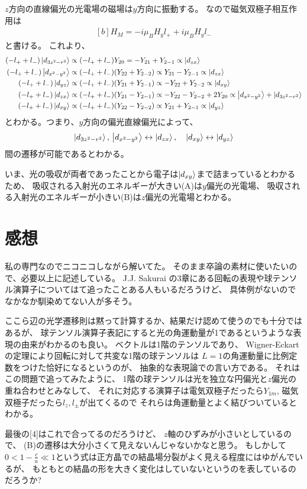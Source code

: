 \documentclass[../ap_2011.tex]{subfiles}
\begin{document}
\(z\)方向の直線偏光の光電場の磁場は\(y\)方向に振動する。
なので磁気双極子相互作用は
\begin{equation}\begin{aligned}[b]
    H_M = -i\mu_BH_yl_+ + i\mu_BH_yl_-
\end{aligned}\end{equation}
と書ける。
これより、
\begin{equation}\begin{aligned}[b]
    (-l_+ +l_-)\ket{d_{3z^2-r^2}} &\propto (-l_+ +l_-) Y_{20} = -Y_{21}+Y_{2-1} \propto \ket{d_{zx}}\\
    (-l_+ +l_-)\ket{d_{x^2-y^2}} &\propto (-l_+ +l_-) (Y_{22}+Y_{2-2}) \propto Y_{21}-Y_{2-1} \propto \ket{d_{zx}}\\
    (-l_+ +l_-)\ket{d_{yz}} &\propto (-l_+ +l_-) (Y_{21}+Y_{2-1}) \propto -Y_{22}+Y_{2-2} \propto \ket{d_{xy}}\\
    (-l_+ +l_-)\ket{d_{zx}} &\propto (-l_+ +l_-) (Y_{21}-Y_{2-1}) \propto -Y_{22}-Y_{2-2}+2Y_{20} \propto \ket{d_{x^2-y^2}}+\ket{d_{3z^2-r^2}}\\
    (-l_+ +l_-)\ket{d_{xy}} &\propto (-l_+ +l_-) (Y_{22}-Y_{2-2}) \propto Y_{21}+Y_{2-1} \propto \ket{d_{yz}}
\end{aligned}\end{equation}
とわかる。つまり、\(y\)方向の偏光直線偏光によって、
\begin{equation}\begin{aligned}[b]
    \ket{d_{3z^2-r^2}},\,\ket{d_{x^2-y^2}}\leftrightarrow \ket{d_{zx}},\quad \ket{d_{xy}}\leftrightarrow\ket{d_{yz}}
\end{aligned}\end{equation}
間の遷移が可能であるとわかる。

いま、光の吸収が両者であったことから電子は\(\ket{d_{xy}}\)まで詰まっているとわかるため、
吸収される入射光のエネルギーが大きい(A)は\(y\)偏光の光電場、
吸収される入射光のエネルギーが小きい(B)は\(z\)偏光の光電場とわかる。

\section*{感想}
私の専門なのでニコニコしながら解いてた。
そのまま卒論の素材に使いたいので、必要以上に記述している。
J.J. Sakurai の3章にある回転の表現や球テンソル演算子についてはて追ったことある人もいるだろうけど、
具体例がないのでなかなか馴染めてない人が多そう。

ここら辺の光学遷移則は黙って計算するか、結果だけ認めて使うのでも十分ではあるが、
球テンソル演算子表記にすると光の角運動量が1であるというような表現の由来がわかるのも良い。
ベクトルは1階のテンソルであり、
Wigner-Eckart の定理により回転に対して共変な1階の球テンソルは
\(L=1\)の角運動量に比例定数をつけた恰好になるというのが、
抽象的な表現論での言い方である。
それはこの問題で追ってみたように、
1階の球テンソルは光を独立な円偏光と\(z\)偏光の重ね合わせとみなして、
それに対応する演算子は電気双極子だったら\(Y_{1m}\), 磁気双極子だったら\(l_z,l_\pm\)が出てくるので
それらは角運動量とよく結びついているとわかる。

最後の[4]はこれで合ってるのだろうけど、
\(z\)軸のひずみが小さいとしているので、
(B)の遷移は大分小さくて見えないんじゃないかなと思う。
もしかして\(0<1-\frac{c}{a}\ll 1\)という式は正方晶での結晶場分裂がよく見える程度にはゆがんでいるが、
もともとの結晶の形を大きく変化はしていないというのを表しているのだろうか?
\end{document}
